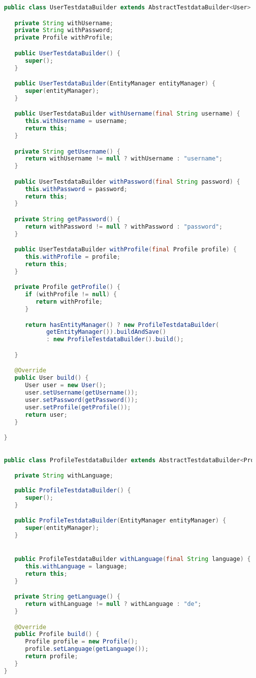 \begin{lstlisting}[language={JAVA},caption=User Testdatabuilder]
public class UserTestdataBuilder extends AbstractTestdataBuilder<User> {

   private String withUsername;
   private String withPassword;
   private Profile withProfile;

   public UserTestdataBuilder() {
      super();
   }

   public UserTestdataBuilder(EntityManager entityManager) {
      super(entityManager);
   }

   public UserTestdataBuilder withUsername(final String username) {
      this.withUsername = username;
      return this;
   }

   private String getUsername() {
      return withUsername != null ? withUsername : "username";
   }

   public UserTestdataBuilder withPassword(final String password) {
      this.withPassword = password;
      return this;
   }

   private String getPassword() {
      return withPassword != null ? withPassword : "password";
   }

   public UserTestdataBuilder withProfile(final Profile profile) {
      this.withProfile = profile;
      return this;
   }

   private Profile getProfile() {
      if (withProfile != null) {
         return withProfile;
      }

      return hasEntityManager() ? new ProfileTestdataBuilder(
            getEntityManager()).buildAndSave()
            : new ProfileTestdataBuilder().build();

   }

   @Override
   public User build() {
      User user = new User();
      user.setUsername(getUsername());
      user.setPassword(getPassword());
      user.setProfile(getProfile());
      return user;
   }

}
\end{lstlisting}

\begin{lstlisting}[language={JAVA},caption=Profile Testdatabuilder]

public class ProfileTestdataBuilder extends AbstractTestdataBuilder<Profile> {

   private String withLanguage;
   
   public ProfileTestdataBuilder() {
      super();
   }

   public ProfileTestdataBuilder(EntityManager entityManager) {
      super(entityManager);
   }


   public ProfileTestdataBuilder withLanguage(final String language) {
      this.withLanguage = language;
      return this;
   }

   private String getLanguage() {
      return withLanguage != null ? withLanguage : "de";
   }

   @Override
   public Profile build() {
      Profile profile = new Profile();
      profile.setLanguage(getLanguage());
      return profile;
   }
}
\end{lstlisting}


